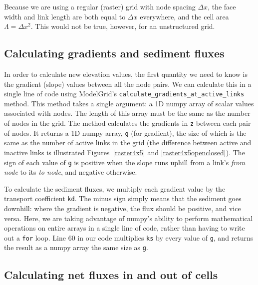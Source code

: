 \documentclass[12pt]{article}
\newcommand{\code}[1]{{\tt #1}}
\begin{document}
Because we are using a regular (raster) grid with node spacing $\Delta x$, the face width and link length are both equal to $\Delta x$ everywhere, and the cell area $\Lambda=\Delta x^2$. This would not be true, however, for an unstructured grid.

\subsection{Calculating gradients and sediment fluxes}



In order to calculate new elevation values, the first quantity we need to know is the gradient (slope) values between all the node pairs. We can calculate this in a single line of code using ModelGrid's \code{calculate\_gradients\_at\_active\_links} method. This method takes a single argument: a 1D numpy array of scalar values associated with nodes. The length of this array must be the same as the number of nodes in the grid. The method calculates the gradients in \code{z} between each pair of nodes. It returns a 1D numpy array, \code{g} (for gradient), the size of which is the same as the number of active links in the grid (the difference between active and inactive links is illustrated Figures~\ref{raster4x5} and \ref{raster4x5openclosed}). The sign of each value of \code{g} is positive when the slope runs uphill from a link's {\em from node} to its {\em to node}, and negative otherwise.

To calculate the sediment fluxes, we multiply each gradient value by the transport coefficient \code{kd}. The minus sign simply means that the sediment goes downhill: where the gradient is negative, the flux should be positive, and vice versa. Here, we are taking advantage of numpy's ability to perform mathematical operations on entire arrays in a single line of code, rather than having to write out a \code{for} loop. Line 60 in our code multiplies \code{ks} by every value of \code{g}, and returns the result as a numpy array the same size as \code{g}.

\subsection{Calculating net fluxes in and out of cells}


\end{document}
